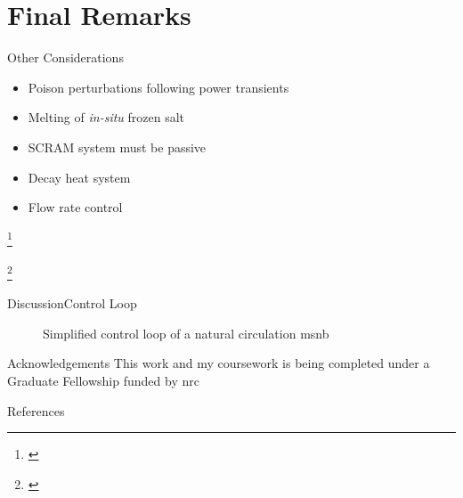 \documentclass[aspectratio=169,pdftex,dvipsnames]{beamer}
\newcommand\blfootnote[1]{%
  \begingroup
  \renewcommand\thefootnote{}\footnote{#1}%
  \addtocounter{footnote}{-1}%
  \endgroup
}
\newcommand{\acf}{\acrfull} %
\newcommand{\acs}{\acrshort} %
\begin{document}
\section{Final Remarks}
\begin{frame}{Other Considerations}
    \begin{itemize}
        \item Poison perturbations following power transients \cite{Roberson}
        \item Melting of \textit{in-situ} frozen salt
        \item SCRAM system must be passive
        \item Decay heat system \cite{DecayHeat}
        \item Flow rate control
    \end{itemize}

    \blfootnote{\tiny\cite{Roberson} \tiny{}}
    \blfootnote{\tiny\cite{DecayHeat} \tiny{}}
\end{frame}

\begin{frame}{Discussion}{Control Loop}

        \begin{figure}[!ht]
            \centering
            
            \caption{Simplified control loop of a natural circulation \acs{msnb}}
            \label{fig:SimpleControlLoop}
        \end{figure}
    
\end{frame}

\begin{frame}{Acknowledgements}
    \centering
    This work and my coursework is being completed under a Graduate Fellowship funded by \acf{nrc}
\end{frame}


\begin{frame}[allowframebreaks]{References}
    
    \footnotesize
    
\end{frame}
\end{document}
